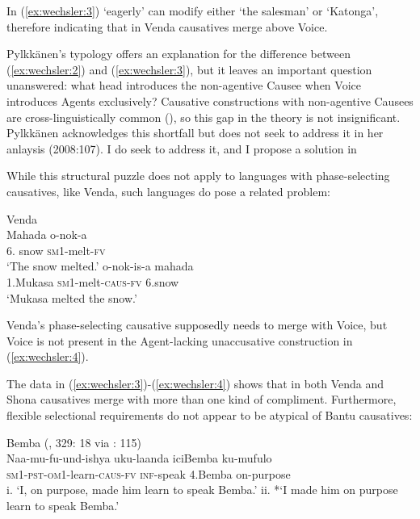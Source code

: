 \documentclass[output=paper,modfonts,nonflat]{langsci/langscibook}
\begin{document}
In (\ref{ex:wechsler:3}) ‘eagerly’ can modify either ‘the salesman’ or ‘Katonga’, therefore indicating that in Venda causatives merge above Voice.  



Pylkkänen’s typology offers an explanation for the difference between (\ref{ex:wechsler:2}) and (\ref{ex:wechsler:3}), but it leaves an important question unanswered: what head introduces the non-agentive Causee when Voice introduces Agents exclusively? Causative constructions with non-agentive Causees are cross-linguistically common (\citealt{Kulikov2001,Kittilä2013}), so this gap in the theory is not insignificant. Pylkkänen acknowledges this shortfall but does not seek to address it in her anlaysis (2008:107). I do seek to address it, and I propose a solution in   



While this structural puzzle does not apply to languages with phase-selecting causatives, like Venda, such languages do pose a related problem:


\ea\label{ex:wechsler:4}
Venda \citet[2]{Pylkkänen2008}\\
\ea
\gll Mahada  {{o-nok-a}} \\
6. snow  {\textsc{sm1}{}-melt-\textsc{fv} }\\
\glt `The snow melted.'
\ex 
{}  {{o-nok-is-a} } {mahada}\\
 {1.Mukasa}   {\textsc{sm1}{}-melt-\textsc{caus}{}-\textsc{fv} }  6.snow\\
\glt `Mukasa melted the snow.'
\z
\z

Venda’s phase-selecting causative supposedly needs to merge with Voice, but Voice is not present in the Agent-lacking unaccusative construction in (\ref{ex:wechsler:4}).

The data in (\ref{ex:wechsler:3})-(\ref{ex:wechsler:4}) shows that in both Venda and Shona causatives merge with more than one kind of compliment. Furthermore, flexible selectional requirements do not appear to be atypical of Bantu causatives: 

\ea\label{ex:wechsler:5}
{Bemba (\citealt{Givón1976}, 329: 18 via \citealt{Pylkkänen2008}: 115)}\\
{Naa-mu-fu-und-ishya} {uku-laanda} {iciBemba} {ku-mufulo}\\
\textsc{sm}1\textsc{{}-pst-om1}{}-learn-\textsc{caus-fv}  \textsc{inf-}speak  4.Bemba  on-purpose\\
\glt i. ‘I, on purpose, made him learn to speak Bemba.’
\glt ii. *‘I made him on purpose learn to speak Bemba.'
\z
\end{document}
